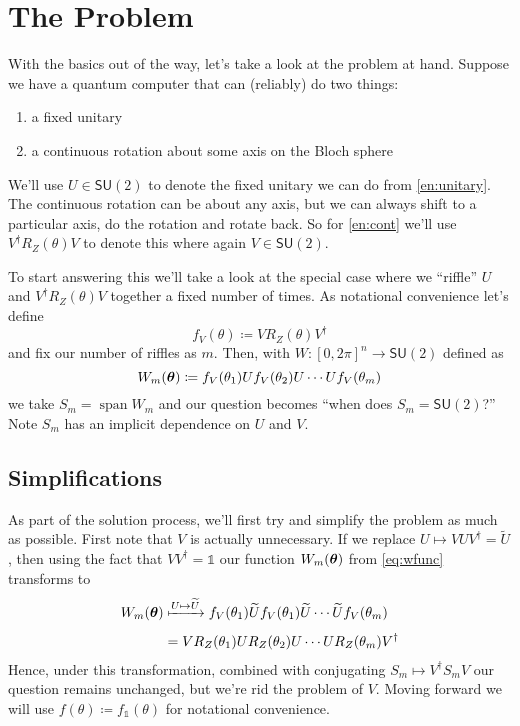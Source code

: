\documentclass[12pt,dvipsnames]{article}
\newcommand{\SU}[1]{\mathsf{SU} (#1)}
\newcommand{\1}{\mathbb{1}}
\DeclareMathOperator{\vspan}{span}
\theoremstyle{plain}
\begin{document}
\section{The Problem}

With the basics out of the way, let's take a look at the problem at hand.
Suppose we have a quantum computer that can (reliably) do two things:
\begin{enumerate}
    \item a fixed unitary\label{en:unitary}
    \item a continuous rotation about some axis on the Bloch sphere\label{en:cont}
\end{enumerate}
We'll use $U\in \SU{2}$ to denote the fixed unitary we can do from \cref{en:unitary}. The continuous rotation can be about any axis, but we can always shift to a particular axis, do the rotation and rotate back. So for \cref{en:cont} we'll use $V^\dagger R_Z(\theta)V$ to denote this where again $V\in \SU{2}$.

To start answering this we'll take a look at the special case where we ``riffle'' $U$ and $V^\dagger R_Z(\theta)V$ together a fixed number of times. As notational convenience let's define
\begin{equation}
    f_V(\theta)\coloneqq VR_Z(\theta)V^\dagger
\end{equation}
and fix our number of riffles as $m$. Then, with $W:[0, 2\pi]^n\to\SU{2}$ defined as
\begin{equation}\label{eq:wfunc}
    W_m(\vb*{\theta}) \coloneqq f_V(\theta_1)Uf_V(\theta_2)U\cdots U f_V(\theta_m)
\end{equation}
we take $S_m = \vspan W_m$ and our question becomes ``when does $S_{m} = \SU{2}$?'' Note $S_m$ has an implicit dependence on $U$ and $V$.

\subsection{Simplifications}

As part of the solution process, we'll first try and simplify the problem as much as possible. First note that $V$ is actually unnecessary. If we replace $U\mapsto VUV^\dagger = \widetilde{U}$, then using the fact that $VV^\dagger = \1$ our function $W_m(\vb*{\theta})$ from \cref{eq:wfunc} transforms to
\begin{align*}
    W_m(\vb*{\theta}) & \xmapsto{U\mapsto \widetilde{U}} f_V(\theta_1)\widetilde{U}f_V(\theta_1)\widetilde{U}\cdots \widetilde{U}f_V(\theta_m) \\[0.4em]
                      & = VR_Z(\theta_1)U R_Z(\theta_2) U \cdots U R_Z(\theta_m)V^\dagger
\end{align*}
Hence, under this transformation, combined with conjugating $S_m\mapsto V^\dagger S_m V$ our question remains unchanged, but we're rid the problem of $V$. Moving forward we will use $f(\theta)\coloneqq f_\1(\theta)$ for notational convenience.
\end{document}
